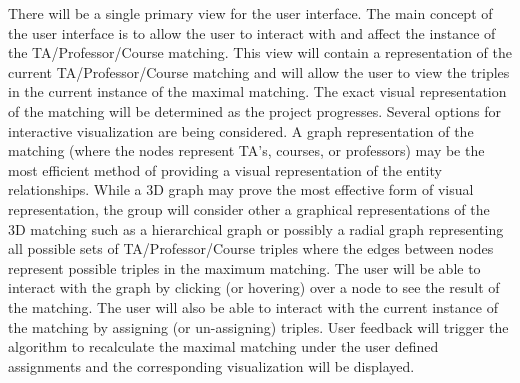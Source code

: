 There will be a single primary view for the user interface. The main concept of the user interface is to allow the user to interact with and affect the instance of the TA/Professor/Course matching. This view will contain a representation of the current TA/Professor/Course matching and will allow the user to view the triples in the current instance of the maximal matching. The exact visual representation of the matching will be determined as the project progresses. Several options for interactive visualization are being considered. A graph representation of the matching (where the nodes represent TA's, courses, or professors) may be the most efficient method of providing a visual representation of the entity relationships. While a 3D graph may prove the most effective form of visual representation, the group will consider other a graphical representations of the 3D matching such as a hierarchical graph or possibly a radial graph representing all possible sets of TA/Professor/Course triples where the edges between nodes represent possible triples in the maximum matching. The user will be able to interact with the graph by clicking (or hovering) over a node to see the result of the matching. The user will also be able to interact with the current instance of the matching by assigning (or un-assigning) triples. User feedback will trigger the algorithm to recalculate the maximal matching under the user defined assignments and the corresponding visualization will be displayed.  
